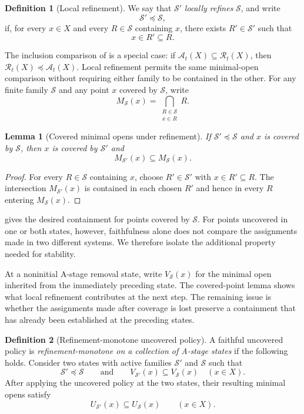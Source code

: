 \documentclass[a4paper,11pt]{article}
\newtheorem{lemma}[lemma]{Lemma}
\theoremstyle{definition}
\newtheorem{definition}[definition]{Definition}
\theoremstyle{remark}
\begin{document}
\begin{definition}[Local refinement]
\label{def:local-rule-refinement}
We say that $\mathcal S'$ \emph{locally refines} $\mathcal S$, and write
$$
\mathcal S'\preccurlyeq\mathcal S,
$$
if, for every $x\in X$ and every $R\in\mathcal S$ containing $x$, there exists $R'\in\mathcal S'$ such that
$$
x\in R'\subseteq R.
$$
\end{definition}

The inclusion comparison of  is a special case: if $\mathcal A_t(X)\subseteq\mathcal R_t(X)$, then $\mathcal R_t(X)\preccurlyeq\mathcal A_t(X)$. Local refinement permits the same minimal-open comparison without requiring either family to be contained in the other. For any finite family $\mathcal S$ and any point $x$ covered by $\mathcal S$, write
$$
M_{\mathcal S}(x)=\bigcap_{\substack{R\in\mathcal S\\x\in R}}R.
$$

\begin{lemma}[Covered minimal opens under refinement]
\label{lem:rule-refinement-minimal-open}
If $\mathcal S'\preccurlyeq\mathcal S$ and $x$ is covered by $\mathcal S$, then $x$ is covered by $\mathcal S'$ and
$$
M_{\mathcal S'}(x)\subseteq M_{\mathcal S}(x).
$$
\end{lemma}

\begin{proof}
For every $R\in\mathcal S$ containing $x$, choose $R'\in\mathcal S'$ with $x\in R'\subseteq R$. The intersection $M_{\mathcal S'}(x)$ is contained in each chosen $R'$ and hence in every $R$ entering $M_{\mathcal S}(x)$.
\end{proof}

 gives the desired containment for points covered by $\mathcal S$. For points uncovered in one or both states, however, faithfulness alone does not compare the assignments made in two different systems. We therefore isolate the additional property needed for stability.

At a noninitial A-stage removal state, write $V_{\mathcal S}(x)$ for the minimal open inherited from the immediately preceding state. The covered-point lemma shows what local refinement contributes at the next step. The remaining issue is whether the assignments made after coverage is lost preserve a containment that has already been established at the preceding states.

\begin{definition}[Refinement-monotone uncovered policy]
\label{def:refinement-monotone-continuation}
A faithful uncovered policy is \emph{refinement-monotone on a collection of A-stage states} if the following holds. Consider two states with active families $\mathcal S'$ and $\mathcal S$ such that
$$
\mathcal S'\preccurlyeq\mathcal S
\qquad\text{and}\qquad
V_{\mathcal S'}(x)\subseteq V_{\mathcal S}(x)
\quad(x\in X).
$$
After applying the uncovered policy at the two states, their resulting minimal opens satisfy
$$
U_{\mathcal S'}(x)\subseteq U_{\mathcal S}(x)
\qquad(x\in X).
$$
\end{definition}
\end{document}
